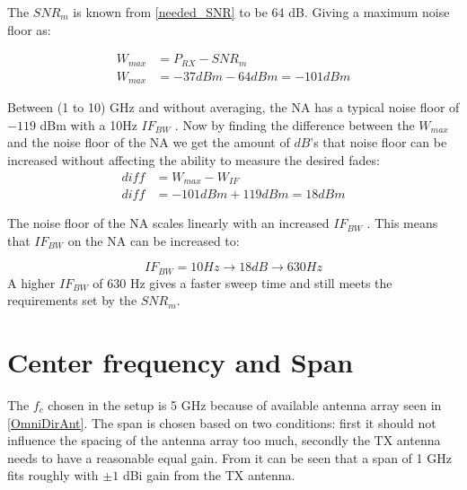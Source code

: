 The $SNR_m$ is known from \autoref{needed_SNR} to be 64 dB. Giving a maximum noise floor as:

\begin{align}
W_{max} &= P_{RX}-SNR_m\\
W_{max} &= -37 dBm -64 dBm = -101 dBm
\end{align}
\begin{where}
\end{where}

Between (1 to 10) GHz and without averaging, the NA has a typical noise floor of $-119$ dBm with a 10Hz $IF_{BW}$ \citep{Key_PNA}. Now by finding the difference between the $W_{max}$ and the noise floor of the NA we get the amount of $dB$'s that noise floor can be increased without affecting the ability to measure the desired fades:
\begin{align}
diff &= W_{max}-W_{IF}\\
diff &= -101dBm+119dBm = 18dBm 
\end{align}
\begin{where}
\end{where}

The noise floor of the \gls{NA} scales linearly with an increased $IF_{BW}$ \citep{PNA_scale}. This means that $IF_{BW}$ on the \gls{NA} can be increased to:

\begin{equation}
IF_{BW} = 10Hz \rightarrow 18dB \rightarrow 630 Hz
\end{equation}
A higher $IF_{BW}$ of 630 Hz  gives a faster sweep time and still meets the requirements set by the $SNR_m$.

\section{Center frequency and Span}
The $f_{c}$ chosen in the setup is 5 GHz because of available antenna array seen in \autoref{OmniDirAnt}. The span is chosen based on two conditions: first it should not influence the spacing of the antenna array too much, secondly the TX antenna needs to have a reasonable equal gain. From  it can be seen that a span of 1 GHz fits roughly with $\pm 1$ dBi gain from the TX antenna.


